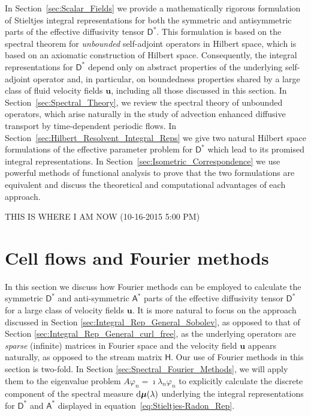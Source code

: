 \documentclass[leqno,onefignum,onetabnum]{siamltex1213}
\newcommand{\secref}[1]{Section~\ref{#1}}
\renewcommand{\d}{\mathrm{d}}
\newcommand{\Dm}{\mathsf{D}}
\newcommand{\Hm}{\mathsf{H}}
\newcommand{\Am}{\mathsf{A}}
\newcommand\bmu{\mbox{\boldmath${\mu}$}}
\newcommand{\vecu}{\boldsymbol{u}}
\begin{document}
In \secref{sec:Scalar_Fields} we provide a mathematically rigorous
formulation of Stieltjes integral representations for both the
symmetric and antisymmetric parts of the effective diffusivity tensor
$\Dm^*$. This formulation is based on the spectral theorem for
\emph{unbounded} self-adjoint operators in  Hilbert space, which is
based on an axiomatic construction of Hilbert 
space. Consequently, the integral representations for $\Dm^*$ depend
only on abstract properties of the underlying self-adjoint operator
and, in particular, on boundedness properties shared by a large
class of fluid velocity fields $\vecu$, including all those
discussed in this section. In \secref{sec:Spectral_Theory}, we
review the spectral theory of unbounded operators, which arise
naturally in the study of advection enhanced diffusive transport by
time-dependent periodic flows. In 
\secref{sec:Hilbert_Resolvent_Integral_Reps} we give two natural
Hilbert space formulations of the effective parameter problem for
$\Dm^*$ which lead to its promised integral representations. In
\secref{sec:Isometric_Correspondence} we use powerful methods of
functional analysis to prove that the two formulations are equivalent
and discuss the theoretical and computational advantages of each
approach.  


\newpage


THIS IS WHERE I AM NOW (10-16-2015 5:00 PM)


\section{Cell flows and Fourier methods}\label{sec:Fourier_Methods}
%
In this section we discuss how Fourier methods can be employed to
calculate the symmetric $\Dm^*$ and anti-symmetric $\Am^*$
parts of the effective diffusivity tensor $\Dm^*$ for a large class
of velocity fields $\vecu $. It is more natural  to focus on the
approach discussed in Section \ref{sec:Integral_Rep_General_Sobolev},
as opposed to that of Section
\ref{sec:Integral_Rep_General_curl_free}, as the underlying operators
are \emph{sparse} (infinite) matrices in Fourier space and the 
velocity field $\vecu $ appears naturally, as opposed to the stream
matrix $\Hm$. Our use of Fourier methods in this section is
two-fold. In Section \ref{sec:Spectral_Fourier_Methods}, we will apply
them to the eigenvalue problem $A\varphi_n=\imath\lambda_n\varphi_n$
to explicitly calculate the discrete component of the spectral
measure $\d\bmu(\lambda)$ underlying the integral representations for
$\Dm^*$ and $\Am^*$ displayed in
equation~\eqref{eq:Stieltjes-Radon_Rep}.  
\end{document}
